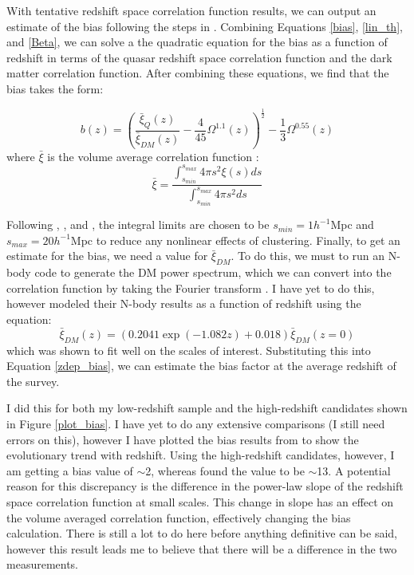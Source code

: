 \documentclass[onecolumn]{emulateapj}
\begin{document}
With tentative redshift space correlation function results, we can output an estimate of the bias following the steps in \citet{Ross2009}. Combining Equations \ref{bias}, \ref{lin_th}, and \ref{Beta}, we can solve a the quadratic equation for the bias as a function of redshift in terms of the quasar redshift space correlation function and the dark matter correlation function. After combining these equations, we find that the bias takes the form:

\begin{equation}\label{zdep_bias}
b(z) = \left( \frac{\bar{\xi}_Q(z)}{\bar{\xi}_{DM}(z)} - \frac{4}{45}\Omega^{1.1}(z)\right)^{\frac{1}{2}} - \frac{1}{3}\Omega^{0.55}(z)
\end{equation}
where $\bar{\xi}$ is the volume average correlation function \citep{Ross2009}:
\begin{equation}
\bar{\xi} = \frac{\int_{s_{min}}^{s_{max}} 4\pi s^2 \xi(s) ds }{\int_{s_{min}}^{s_{max}} 4\pi s^2  ds}
\end{equation}

Following \citet{Croom2005}, \citet{DaAngela2008}, and \citet{Ross2009}, the integral limits are chosen to be $s_{min}=1h^{-1}$Mpc and $s_{max}=20h^{-1}$Mpc to reduce any nonlinear effects of clustering. Finally, to get an estimate for the bias, we need a value for $\bar{\xi}_{DM}$. To do this, we must to run an N-body code to generate the DM power spectrum, which we can convert into the correlation function by taking the Fourier transform \citep{Smith2003}. I have yet to do this, however \citet{Ross2009} modeled their N-body results as a function of redshift using the equation:
\begin{equation}
\bar{\xi}_{DM}(z) = \left(0.2041 \exp(-1.082z) + 0.018 \right)\bar{\xi}_{DM}(z=0)
\end{equation}
which was shown to fit well on the scales of interest. Substituting this into Equation \ref{zdep_bias}, we can estimate the bias factor at the average redshift of the survey. 

I did this for both my low-redshift sample and the high-redshift candidates shown in Figure \ref{plot_bias}. I have yet to do any extensive comparisons (I still need errors on this), however I have plotted the bias results from \citet{Ross2009} to show the evolutionary trend with redshift. Using the high-redshift candidates, however, I am getting a bias value of $\sim$2, whereas \citet{Shen2007} found the value to be $\sim$13. A potential reason for this discrepancy is the difference in the power-law slope of the redshift space correlation function at small scales. This change in slope has an effect on the volume averaged correlation function, effectively changing the bias calculation. There is still a lot to do here before anything definitive can be said, however this result leads me to believe that there will be a difference in the two measurements.
\end{document}
